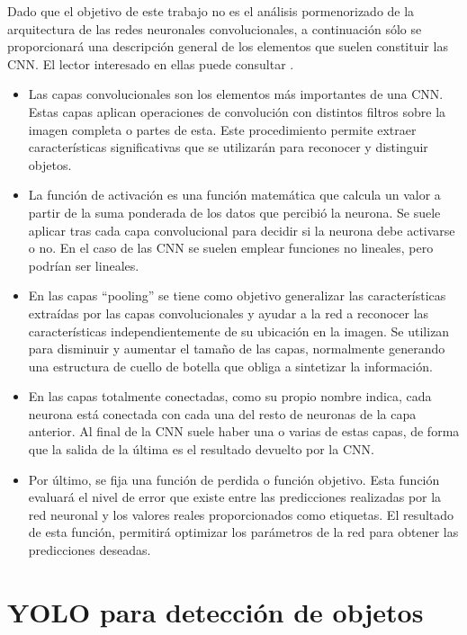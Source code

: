 Dado que el objetivo de este trabajo no es el análisis pormenorizado de la arquitectura de las redes neuronales convolucionales, a continuación sólo se proporcionará una descripción general de los elementos que suelen constituir las CNN. El lector interesado en ellas puede consultar \cite{cnnindetail}.

\begin{itemize}
    \item Las capas convolucionales son los elementos más importantes de una CNN. Estas capas aplican operaciones de convolución con distintos filtros sobre la imagen completa o partes de esta. Este procedimiento permite extraer características significativas que se utilizarán para reconocer y distinguir objetos.
    \item La función de activación es una función matemática que calcula un valor a partir de la suma ponderada de los datos que percibió la neurona. Se suele aplicar tras cada capa convolucional para decidir si la neurona debe activarse o no. En el caso de las CNN se suelen emplear funciones no lineales, pero podrían ser lineales.
    \item En las capas ``pooling'' se tiene como objetivo generalizar las características extraídas por las capas convolucionales y ayudar a la red a reconocer las características independientemente de su ubicación en la imagen. Se utilizan para disminuir y aumentar el tamaño de las capas, normalmente generando una estructura de cuello de botella que obliga a sintetizar la información.
    \item En las capas totalmente conectadas, como su propio nombre indica, cada neurona está conectada con cada una del resto de neuronas de la capa anterior. Al final de la CNN suele haber una o varias de estas capas, de forma que la salida de la última es el resultado devuelto por la CNN.
    \item Por último, se fija una función de perdida o función objetivo. Esta función evaluará el nivel de error que existe entre las predicciones realizadas por la red neuronal y los valores reales proporcionados como etiquetas. El resultado de esta función, permitirá optimizar los parámetros de la red para obtener las predicciones deseadas. 
\end{itemize}

\section{YOLO para detección de objetos}

